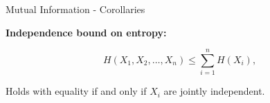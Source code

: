 \documentclass[11pt,compress,t,notes=noshow, xcolor=table]{beamer}
\begin{document}
\begin{vbframe}{Mutual Information - Corollaries}












\framebreak

\textbf{Independence bound on entropy:} 


\footnotesize
$$H\left(X_{1}, X_{2}, \ldots, X_{n}\right) \leq \sum_{i=1}^{n} H\left(X_{i}\right),$$
\normalsize

Holds with equality if and only if $X_{i}$ are jointly independent.


\end{vbframe}
\end{document}
